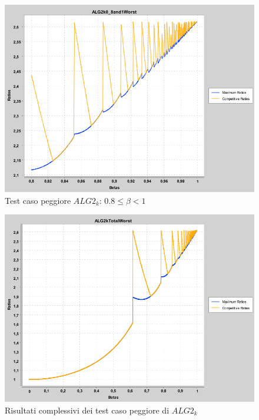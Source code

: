 \documentclass[12pt]{article}
\begin{document}
\begin{figure}[H]
\caption{Test caso peggiore $ALG2_{k}$: $0.8 \leq \beta < 1$}
\centering
\includegraphics[scale=0.4]{max/ALG2k0_8and1Worst.png}
\end{figure}
\begin{figure}[H]
\caption{Risultati complessivi dei test caso peggiore di $ALG2_{k}$}
\centering
\includegraphics[scale=0.4]{max/ALG2kTotalWorst.png}
\end{figure}
\end{document}
